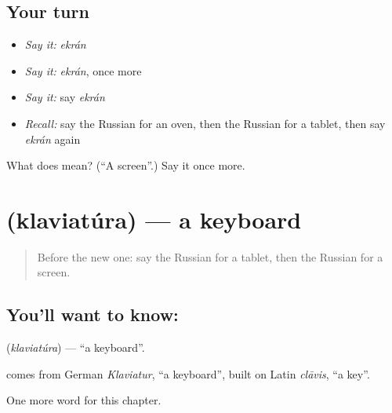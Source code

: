 \subsection*{Your turn}
\begin{itemize}
\raggedright
  \item \emph{Say it:} \emph{ekrán}
  \item \emph{Say it:} \emph{ekrán}, once more
  \item \emph{Say it:} say \emph{ekrán}
  \item \emph{Recall:} say the Russian for an oven, then the Russian for a tablet, then say \emph{ekrán} again
\end{itemize}

\begin{tcolorbox}[breakable,colback=teal!4,colframe=teal!35!black,title={Before you move on}]
What does  mean? (\textquotedblleft{}A screen\textquotedblright{}.) Say it once more.
\end{tcolorbox}
\section[\texorpdfstring{\ru{клавиатура} (klaviatúra)}{клавиатура (klaviatúra)}]{ (klaviatúra) — a keyboard}

\label{lesson:RU-C220-klaviatura}



\begin{quote}
Before the new one: say the Russian for a tablet, then the Russian for a screen.
\end{quote}

\subsection*{You'll want to know: }
\textbf{} (\emph{klaviatúra}) — \textquotedblleft{}a keyboard\textquotedblright{}.

\begin{cousinweb}
\textbf{} comes from German \emph{Klaviatur}, \textquotedblleft{}a keyboard\textquotedblright{}, built on Latin \emph{clāvis}, \textquotedblleft{}a key\textquotedblright{}.
\end{cousinweb}

\begin{grammarlens}[title={What you've built}]
One more word for this chapter.
\end{grammarlens}

